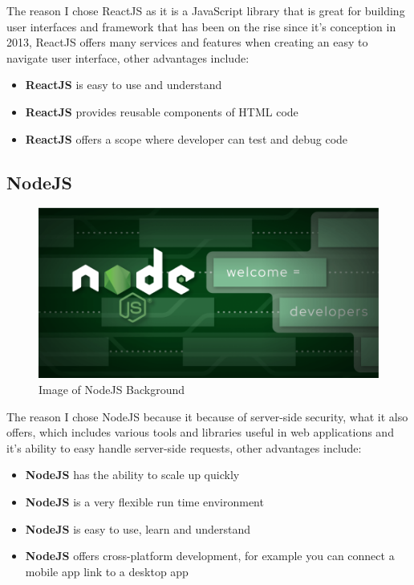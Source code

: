The reason I chose ReactJS as it is a JavaScript library that is great for building user interfaces and framework that has been on the rise since it's conception in 2013, ReactJS offers many services and features when creating an easy to navigate user interface, other advantages include:

\begin{itemize}
\item\textbf{ReactJS} is easy to use and understand
\item\textbf{ReactJS} provides reusable components of HTML code
\item\textbf{ReactJS} offers a scope where developer can test and debug code
\end{itemize}

\subsection{NodeJS}

\begin{figure}[H]
  \includegraphics[scale=0.5]{img/nodejspic.png}
  \centering
  \caption{Image of NodeJS Background}
  \label{fig: NodeJS Background}
\end{figure}

The reason I chose NodeJS because it because of server-side security, what it also offers, which includes various tools and libraries useful in web applications and it's ability to easy handle server-side requests, other advantages include:

\begin{itemize}
\item\textbf{NodeJS} has the ability to scale up quickly
\item\textbf{NodeJS} is a very flexible run time environment
\item\textbf{NodeJS} is easy to use, learn and understand
\item\textbf{NodeJS} offers cross-platform development, for example you can connect a mobile app link to a desktop app
\end{itemize}

